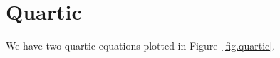 \section{Quartic}
\label{sec.quartic}



\lipsum[9-10] %


We have two quartic equations plotted in Figure~\ref{fig.quartic}.



